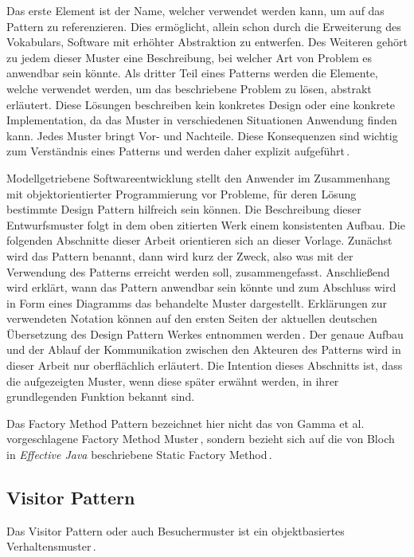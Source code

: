 \documentclass[12pt,oneside,a4paper,parskip]{scrbook}
\begin{document}
Das erste Element ist der Name, welcher verwendet werden kann, um auf das Pattern zu referenzieren. Dies ermöglicht, allein schon durch die Erweiterung des Vokabulars, Software mit erhöhter Abstraktion zu entwerfen. Des Weiteren gehört zu jedem dieser Muster eine Beschreibung, bei welcher Art von Problem es anwendbar sein könnte. Als dritter Teil eines Patterns werden die Elemente, welche verwendet werden, um das beschriebene Problem zu lösen, abstrakt erläutert. Diese Lösungen beschreiben kein konkretes Design oder eine konkrete Implementation, da das Muster in verschiedenen Situationen Anwendung finden kann. Jedes Muster bringt Vor- und Nachteile. Diese Konsequenzen sind wichtig zum Verständnis eines Patterns und werden daher explizit aufgeführt\,\cite[S.30 f.]{gamma2015}.

Modellgetriebene Softwareentwicklung stellt den Anwender im Zusammenhang mit objektorientierter Programmierung vor Probleme, für deren Lösung bestimmte Design Pattern hilfreich sein können. Die Beschreibung dieser Entwurfsmuster folgt in dem oben zitierten Werk einem konsistenten Aufbau. Die folgenden Abschnitte dieser Arbeit orientieren sich an dieser Vorlage. Zunächst wird das Pattern benannt, dann wird kurz der Zweck, also was mit der Verwendung des Patterns erreicht werden soll, zusammengefasst. Anschließend wird erklärt, wann das Pattern anwendbar sein könnte und zum Abschluss wird in Form eines Diagramms das behandelte Muster dargestellt. Erklärungen zur verwendeten Notation können auf den ersten Seiten der aktuellen deutschen Übersetzung des Design Pattern Werkes entnommen werden\,\cite[S. 8]{gamma2015}. Der genaue Aufbau und der Ablauf der Kommunikation zwischen den Akteuren des Patterns wird in dieser Arbeit nur oberflächlich erläutert. Die Intention dieses Abschnitts ist, dass die aufgezeigten Muster, wenn diese später erwähnt werden, in ihrer grundlegenden Funktion bekannt sind.

Das Factory Method Pattern bezeichnet hier nicht das von Gamma et al. vorgeschlagene Factory Method Muster\,\cite[S. 173ff.]{gamma2015}, sondern bezieht sich auf die von Bloch in \textit{Effective Java} beschriebene Static Factory Method\,\cite[S. 5ff.]{bloch2017}.

\subsection{Visitor Pattern}

Das Visitor Pattern oder auch Besuchermuster ist ein objektbasiertes Verhaltensmuster\,\cite[S. 480]{gamma2015}.
\end{document}
